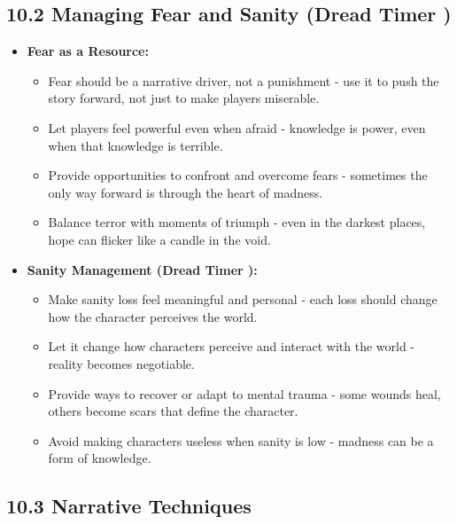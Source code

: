 \documentclass[11pt]{article}
\begin{document}
\subsection*{10.2 Managing Fear and Sanity (Dread Timer )}

\begin{itemize}
\item \textbf{Fear as a Resource:}
\begin{itemize}
\item Fear should be a narrative driver, not a punishment - use it to push the story forward, not just to make players miserable.
\item Let players feel powerful even when afraid - knowledge is power, even when that knowledge is terrible.
\item Provide opportunities to confront and overcome fears - sometimes the only way forward is through the heart of madness.
\item Balance terror with moments of triumph - even in the darkest places, hope can flicker like a candle in the void.
\end{itemize}
\item \textbf{Sanity Management (Dread Timer ):}
\begin{itemize}
\item Make sanity loss feel meaningful and personal - each loss should change how the character perceives the world.
\item Let it change how characters perceive and interact with the world - reality becomes negotiable.
\item Provide ways to recover or adapt to mental trauma - some wounds heal, others become scars that define the character.
\item Avoid making characters useless when sanity is low - madness can be a form of knowledge.
\end{itemize}
\end{itemize}

\clearpage

\subsection*{10.3 Narrative Techniques}
\end{document}
